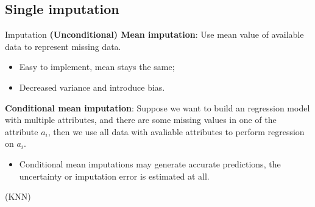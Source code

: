 \documentclass{beamer}
\begin{document}
\subsection{Single imputation}
\begin{frame}{Imputation}
\textbf{(Unconditional) Mean imputation}: Use mean value of available data to represent missing data.
\begin{itemize}
\item Easy to implement, mean stays the same; 
\item Decreased variance and introduce bias. 
\end{itemize}
\textbf{Conditional mean imputation}: Suppose we want to build an regression model with multiple attributes, and there are some missing values in one of the attribute $a_i$, then we use all data with avaliable attributes to perform regression on $a_i$. 
\begin{itemize}
\item{Conditional mean imputations may generate accurate predictions, the uncertainty or imputation error is estimated at all.}
\end{itemize}
(KNN)
\end{frame}
\end{document}
